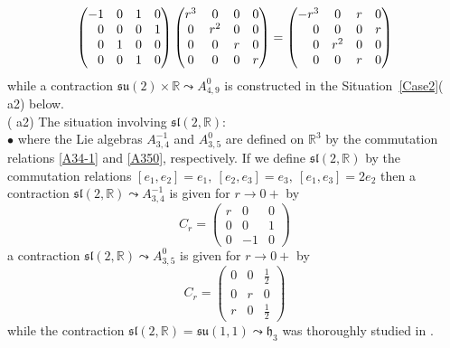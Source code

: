 \documentclass[
reqno]{amsart}
\begin{document}
\begin{itemize}
$$\begin{pmatrix}
-1 & 0 & 1 & 0 \\
\hfill 0 & 0 & 0 & 1 \\
\hfill 0 & 1 & 0 & 0 \\
\hfill 0 & 0 & 1 & 0 
\end{pmatrix} 
\begin{pmatrix}
r^3 & 0 & 0 & 0 \\
  0 & r^2 & 0 &0 \\
  0 & 0 & r & 0 \\
  0 & 0 & 0 & r 
\end{pmatrix}
=\begin{pmatrix}
-r^3 & 0 & r & 0 \\
\hfill 0 & 0 & 0 & r \\
\hfill 0 & r^2 & 0 & 0 \\
\hfill 0 & 0   & r & 0 
\end{pmatrix}$$
while a contraction ${{\mathfrak s}{\mathfrak u}}(2)\times{{\mathbb R}}{\leadsto} A_{4,9}^0$ is constructed in the Situation~\ref{Case2}({{\bfseries\itshape} a2}) below. 
\\ ({{\bfseries\itshape} a2}) The situation involving ${{\mathfrak s}{\mathfrak l}}(2,{{\mathbb R}})$:   
\\ $\bullet$ 
where the Lie algebras $A_{3,4}^{-1}$ and $A_{3,5}^0$ are defined on ${{\mathbb R}}^3$ by the commutation relations \eqref{A34-1} and \eqref{A350}, 
respectively. 
If we define ${{\mathfrak s}{\mathfrak l}}(2,{{\mathbb R}})$ by the commutation relations 
$[e_1,e_2]=e_1,\ [e_2,e_3]=e_3,\ [e_1,e_3]=2e_2$
then 
a contraction ${{\mathfrak s}{\mathfrak l}}(2,{{\mathbb R}}){\leadsto} A_{3,4}^{-1}$ is given for $r\to0+$ by 
$$C_r= 
\begin{pmatrix} 
r & 0 & 0 \\
0 & 0 & 1 \\
0 & -1 & 0
\end{pmatrix}$$
a contraction ${{\mathfrak s}{\mathfrak l}}(2,{{\mathbb R}}){\leadsto} A_{3,5}^0$ is given for $r\to0+$ by 
$$C_r= 
\begin{pmatrix} 
0 & 0 & \frac{1}{2} \\
0 & r & 0 \\
r & 0 & \frac{1}{2}
\end{pmatrix}$$
while the contraction ${{\mathfrak s}{\mathfrak l}}(2,{{\mathbb R}})={{\mathfrak s}{\mathfrak u}}(1,1){\leadsto}{{\mathfrak h}}_3$ was thoroughly studied in \cite{Ca04}.  

\end{itemize}
\end{document}
